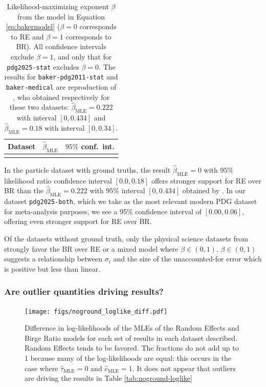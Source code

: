 \documentclass[letterpaper,12pt]{article}
\begin{document}
\begin{table}[htbp]
  \centering
  \caption{Likelihood-maximizing exponent $\beta$ from the model in Equation \ref{eq:bakermodel} ($\beta=0$ corresponds to RE and $\beta=1$ corresponds to BR). All confidence intervals exclude $\beta=1$, and only that for \texttt{pdg2025-stat} excludes $\beta=0$. The results for \texttt{baker-pdg2011-stat} and \texttt{baker-medical} are reproduction of \citet[pg.~115--116]{baker2013meta}, who obtained respectively for these two datasets: $\hat\beta_{\mathrm{MLE}}=0.222$ with interval $[0, 0.434]$ and $\hat\beta_{\mathrm{MLE}}=0.18$ with interval $[0, 0.34]$.}
  \label{tab:noground-bakermodel}
  \smaller
  \begin{tabular}{l|rr}
  \hline Dataset & $\hat\beta_{\mathrm{MLE}}$ & $95\%$ conf.~int.\\\hline\\\hline
  \end{tabular}
\end{table}


In the particle dataset with ground truths, the result $\hat\beta_{\mathrm{MLE}}=0$ with $95\%$ likelihood ratio confidence interval $[0.0,0.18]$ offers stronger support for RE over BR than the $\hat\beta_{\mathrm{MLE}}=0.222$ with $95\%$ interval $[0,0.434]$ obtained by \citet[pg.~115]{baker2013meta}. In our dataset \texttt{pdg2025-both}, which we take as the most relevant modern PDG dataset for meta-analysis purposes, we see a 95\% confidence interval of $[0.00,0.06]$, offering even stronger support for RE over BR.

Of the datasets without ground truth, only the physical science datasets from \citet{bailey2017not} strongly favor the BR over RE or a mixed model where $\beta\in(0,1)$. $\beta\in(0,1)$ suggests a relationship between $\sigma_i$ and the size of the unaccounted-for error which is positive but less than linear.

\subsubsection{Are outlier quantities driving results?}
\begin{figure}[htbp]
  \centering
  \texttt{[image: figs/noground\_loglike\_diff.pdf]}
  \caption{Difference in log-likelihoods of the MLEs of the Random Effects and Birge Ratio models for each set of results in each dataset described. Random Effects tends to be favored. The fractions do not add up to 1 because many of the log-likelihoods are equal: this occurs in the case where $\hat\tau_{\mathrm{MLE}}=0$ and $\hat{c}_{\mathrm{MLE}}=1$. It does not appear that outliers are driving the results in Table \ref{tab:noground-loglike}}
  \label{fig:noground-loglike}
\end{figure}
\end{document}
